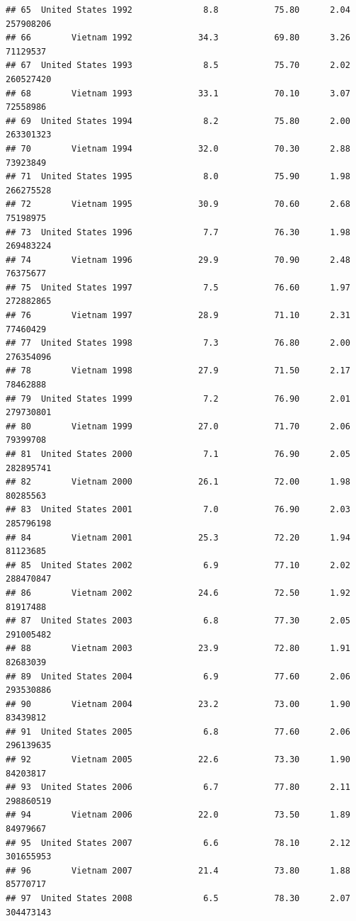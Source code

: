 \documentclass[
]{article}
\begin{document}
\begin{verbatim}
## 65  United States 1992              8.8           75.80      2.04  257908206
## 66        Vietnam 1992             34.3           69.80      3.26   71129537
## 67  United States 1993              8.5           75.70      2.02  260527420
## 68        Vietnam 1993             33.1           70.10      3.07   72558986
## 69  United States 1994              8.2           75.80      2.00  263301323
## 70        Vietnam 1994             32.0           70.30      2.88   73923849
## 71  United States 1995              8.0           75.90      1.98  266275528
## 72        Vietnam 1995             30.9           70.60      2.68   75198975
## 73  United States 1996              7.7           76.30      1.98  269483224
## 74        Vietnam 1996             29.9           70.90      2.48   76375677
## 75  United States 1997              7.5           76.60      1.97  272882865
## 76        Vietnam 1997             28.9           71.10      2.31   77460429
## 77  United States 1998              7.3           76.80      2.00  276354096
## 78        Vietnam 1998             27.9           71.50      2.17   78462888
## 79  United States 1999              7.2           76.90      2.01  279730801
## 80        Vietnam 1999             27.0           71.70      2.06   79399708
## 81  United States 2000              7.1           76.90      2.05  282895741
## 82        Vietnam 2000             26.1           72.00      1.98   80285563
## 83  United States 2001              7.0           76.90      2.03  285796198
## 84        Vietnam 2001             25.3           72.20      1.94   81123685
## 85  United States 2002              6.9           77.10      2.02  288470847
## 86        Vietnam 2002             24.6           72.50      1.92   81917488
## 87  United States 2003              6.8           77.30      2.05  291005482
## 88        Vietnam 2003             23.9           72.80      1.91   82683039
## 89  United States 2004              6.9           77.60      2.06  293530886
## 90        Vietnam 2004             23.2           73.00      1.90   83439812
## 91  United States 2005              6.8           77.60      2.06  296139635
## 92        Vietnam 2005             22.6           73.30      1.90   84203817
## 93  United States 2006              6.7           77.80      2.11  298860519
## 94        Vietnam 2006             22.0           73.50      1.89   84979667
## 95  United States 2007              6.6           78.10      2.12  301655953
## 96        Vietnam 2007             21.4           73.80      1.88   85770717
## 97  United States 2008              6.5           78.30      2.07  304473143

\end{verbatim}
\end{document}
